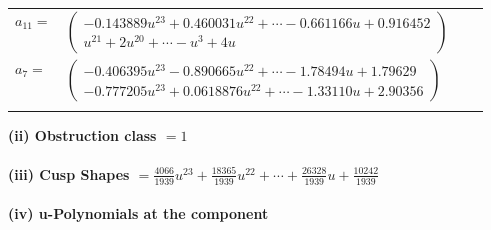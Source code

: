\documentclass[1p]{elsarticle_modified}
\theoremstyle{definition}
\begin{document}
\begin{tabular}{m{7pt} m{180pt} m{7pt} m{180pt} }
\flushright $a_{11}=$&$\begin{pmatrix}-0.143889 u^{23}+0.460031 u^{22}+\cdots-0.661166 u+0.916452\\u^{21}+2 u^{20}+\cdots- u^3+4 u\end{pmatrix}$ \\
\flushright $a_{7}=$&$\begin{pmatrix}-0.406395 u^{23}-0.890665 u^{22}+\cdots-1.78494 u+1.79629\\-0.777205 u^{23}+0.0618876 u^{22}+\cdots-1.33110 u+2.90356\end{pmatrix}$\\&\end{tabular}
\flushleft \textbf{(ii) Obstruction class $= 1$}\\~\\
\flushleft \textbf{(iii) Cusp Shapes $= \frac{4066}{1939} u^{23}+\frac{18365}{1939} u^{22}+\cdots+\frac{26328}{1939} u+\frac{10242}{1939}$}\\~\\
\newpage\renewcommand{\arraystretch}{1}
\flushleft \textbf{(iv) u-Polynomials at the component}\newline \\
\end{document}
